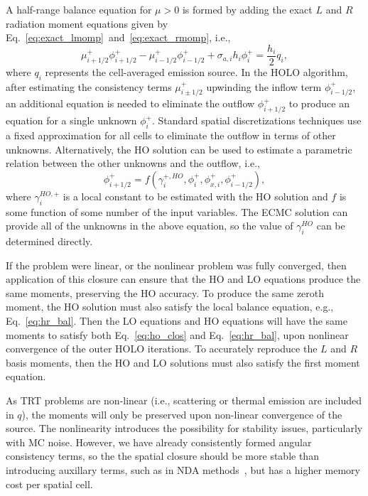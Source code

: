 A half-range balance equation for $\mu>0$ is formed by adding the
exact $L$ and
$R$ radiation moment equations given by
Eq.~\eqref{eq:exact_lmomp}~and~\eqref{eq:exact_rmomp}, i.e.,
\begin{equation}\label{eq:hr_bal}
    \mu^+_{i+1/2}\phi_{i+1/2}^+ - \mu^+_{i-1/2}\phi_{i-1/2}^+ +
    {\sigma_{a,i}h_i} \phi_i^+ = \frac{h_i}{2} q_i,
\end{equation}
where $q_i$ represents the cell-averaged emission source.  In the HOLO algorithm, after
estimating the consistency terms $\mu_{i\pm1/2}^+$ upwinding the inflow term
$\phi_{i-1/2}^+$, an additional equation is needed to eliminate the outflow $\phi_{i+1/2}^+$ to produce an
equation for a single unknown $\phi_{i}^+$.  Standard spatial discretizations techniques
use a fixed approximation for all cells to eliminate the outflow in terms of other
unknowns.  Alternatively, the HO solution can be used to estimate a parametric relation
between the other unknowns and the outflow, i.e.,
\begin{equation}\label{eq:ho_clos}
    \phi_{i+1/2}^+ = f(\gamma^{+,HO}_i, \phi_i^+, \phi_{x,i}^+, \phi_{i-1/2}^+),
\end{equation}
where $\gamma^{HO,+}_i$ is a local constant to be estimated with the HO solution and $f$ is some
function of some number of the input
variables.  The ECMC solution can provide all of the unknowns in the above equation, so
the value of $\gamma^{HO}_i$ can be determined directly. 

If the problem were linear, or the nonlinear problem was fully converged,
then application of this closure can ensure that the HO and LO equations produce the same
moments, preserving the HO accuracy.  To produce the
same zeroth moment, the HO solution must also satisfy the local balance equation, e.g.,
Eq.~\eqref{eq:hr_bal}.  Then the LO equations and HO equations will have the same moments
to satisfy both Eq.~\eqref{eq:ho_clos} and Eq.~\eqref{eq:hr_bal}, upon nonlinear
convergence of the outer HOLO iterations. To accurately reproduce the $L$ and $R$ basis
moments, then the HO and LO solutions must also satisfy the first moment equation.

As TRT problems are non-linear (i.e., scattering or thermal emission are included in
$q$), the moments will only be preserved upon non-linear convergence of the source.  The
nonlinearity introduces the possibility for stability
issues, particularly with MC noise.  However, we have already consistently formed angular consistency terms, so the
the spatial closure should be more stable than introducing auxillary terms, such as
in NDA methods~\cite{rmc,willert}, but has a higher memory cost per spatial cell. 

